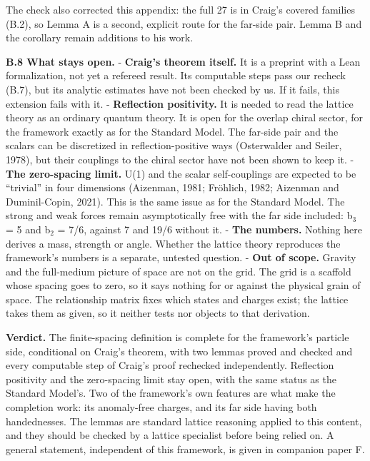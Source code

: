 \documentclass[
  11pt,
]{article}
\begin{document}
The check also corrected this appendix: the full 27 is in Craig's covered families (B.2), so Lemma A is a second, explicit route for the far-side pair. Lemma B and the corollary remain additions to his work.

\textbf{B.8 What stays open.} - \textbf{Craig's theorem itself.} It is a preprint with a Lean formalization, not yet a refereed result. Its computable steps pass our recheck (B.7), but its analytic estimates have not been checked by us. If it fails, this extension fails with it.
- \textbf{Reflection positivity.} It is needed to read the lattice theory as an ordinary quantum theory. It is open for the overlap chiral sector, for the framework exactly as for the Standard Model. The far-side pair and the scalars can be discretized in reflection-positive ways (Osterwalder and Seiler, 1978), but their couplings to the chiral sector have not been shown to keep it.
- \textbf{The zero-spacing limit.} U(1) and the scalar self-couplings are expected to be ``trivial'' in four dimensions (Aizenman, 1981; Fröhlich, 1982; Aizenman and Duminil-Copin, 2021). This is the same issue as for the Standard Model. The strong and weak forces remain asymptotically free with the far side included: b\ensuremath{_{3}} = 5 and b\ensuremath{_{2}} = 7/6, against 7 and 19/6 without it.
- \textbf{The numbers.} Nothing here derives a mass, strength or angle. Whether the lattice theory reproduces the framework's numbers is a separate, untested question.
- \textbf{Out of scope.} Gravity and the full-medium picture of space are not on the grid. The grid is a scaffold whose spacing goes to zero, so it says nothing for or against the physical grain of space. The relationship matrix fixes which states and charges exist; the lattice takes them as given, so it neither tests nor objects to that derivation.

\textbf{Verdict.} The finite-spacing definition is complete for the framework's particle side, conditional on Craig's theorem, with two lemmas proved and checked and every computable step of Craig's proof rechecked independently. Reflection positivity and the zero-spacing limit stay open, with the same status as the Standard Model's. Two of the framework's own features are what make the completion work: its anomaly-free charges, and its far side having both handednesses. The lemmas are standard lattice reasoning applied to this content, and they should be checked by a lattice specialist before being relied on. A general statement, independent of this framework, is given in companion paper F.
\end{document}
